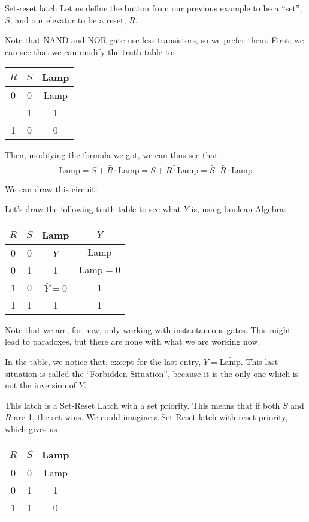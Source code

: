 \documentclass[a4paper]{article}
\begin{document}
\begin{parag}{Set-reset latch}
    Let us define the button from our previous example to be a ``set'', $S$, and our elevator to be a reset, $R$.

    Note that NAND and NOR gate use less transistors, so we prefer them. First, we can see that we can modify the truth table to:
    \begin{center}
    \begin{tabular}{cc|c}
        $R$ & $S$ & Lamp \\
        \hline
        0 & 0 & Lamp \\
        - & 1 & 1 \\
        1 & 0 & 0 \\
    \end{tabular}
    \end{center}

    Then, modifying the formula we got, we can thus see that: 
    \[\text{Lamp} = S + \bar{R} \cdot \text{Lamp} = \bar{\bar{S + R \cdot \text{Lamp}}} = \bar{\bar{S} \cdot \bar{\bar{R} \cdot \text{Lamp}}}\]

    We can draw this circuit:

    Let's draw the following truth table to see what $Y$ is, using boolean Algebra:
    \begin{center}
    \begin{tabular}{cc|cc}
        $R$ & $S$ & Lamp & $Y$ \\
        \hline
        0 & 0 & $\bar{Y}$ & $\bar{\text{Lamp}}$ \\
        0 & 1 & 1 & $\bar{\text{Lamp}} = 0$\\
        1 & 0 & $\bar{Y} = 0$ & 1\\
        1 & 1 & 1 & 1\\
    \end{tabular}
    \end{center}

    Note that we are, for now, only working with instantaneous gates. This might lead to paradoxes, but there are none with what we are working now.

    In the table, we notice that, except for the last entry, $Y = \bar{\text{Lamp}}$. This last situation is called the ``Forbidden Situation'', because it is the only one which is not the inversion of $Y$.
    
    This latch is a Set-Reset Latch with a set priority. This means that if both $S$ and $R$ are 1, the set wins. We could imagine a Set-Reset latch with reset priority, which gives us
    \begin{center}
    \begin{tabular}{cc|c}
        $R$ & $S$ & Lamp \\
        \hline
        0 & 0 & Lamp \\
        0 & 1 & 1 \\
        1 & 1 & 0 \\
    \end{tabular}
    \end{center}
    

\end{parag}
\end{document}
